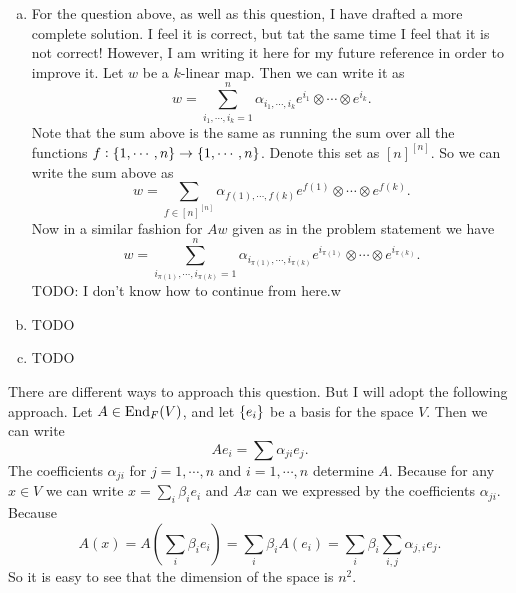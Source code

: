 \begin{problem}
\begin{solution}
\begin{enumerate}[(a)]
			\item For the question above, as well as this question, I have drafted a more complete solution. I feel it is correct, but tat the same time I feel that it is not correct! However, I am writing it here for my future reference in order to improve it.
			Let $ w  $ be a $ k $-linear map. Then we can write it as
			\[ w = \sum_{i_1,\cdots,i_k=1}^n \alpha_{i_1,\cdots,i_k} e^{i_1}\otimes\cdots\otimes e^{i_k}.  \]
			Note that the sum above is the same as running the sum over all the functions $ f:\{1,\cdots,n\}\to \{1,\cdots,n\} $. Denote this set as $ [n]^{[n]} $. So we can write the sum above as
			\[ w = \sum_{f\in[n]^{[n]}} \alpha_{f(1),\cdots,f(k)} e^{f(1)}\otimes\cdots\otimes e^{f(k)}.  \]
			Now in a similar fashion for $ Aw $ given as in the problem statement we have
			\[  w = \sum_{i_{\pi(1)},\cdots,i_{\pi(k)}=1}^n \alpha_{i_{\pi(1)},\cdots,i_{\pi(k)}} e^{i_{\pi(1)}}\otimes\cdots\otimes e^{i_{\pi(k)}}. \]
			{\color{red} \noindent TODO: I don't know how to continue from here.w}
			
			\item {\color{red} \noindent TODO}
			
			\item {\color{red} \noindent TODO}
		\end{enumerate}
	\end{solution}
\end{problem}

\begin{problem}
	\begin{solution}
		There are different ways to approach this question. But I will adopt the following approach. Let $ A \in \operatorname{End}_F(V) $, and let $ \{e_i\} $ be a basis for the space $ V $. Then we can write
		\[ Ae_i = \sum \alpha_{ji}e_j. \]
		The coefficients $ \alpha_{ji} $ for $ j=1,\cdots,n $ and $ i=1,\cdots,n $ determine $ A $. Because for any $ x \in V $ we can write $ x = \sum_i \beta_i e_i $ and $ Ax $ can we expressed by the coefficients $ \alpha_{ji} $. Because
		\[ A(x) = A(\sum_i \beta_i e_i) = \sum_i \beta_i A(e_i) = \sum_i \beta_i \sum_{i,j}\alpha_{j,i} e_j. \]
		So it is easy to see that the dimension of the space is $ n^2 $.
	\end{solution}
\end{problem}

